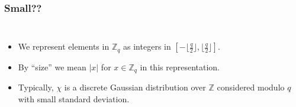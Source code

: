 \documentclass[10pt]{beamer}
\newcommand{\abs}[1]{\ensuremath{|#1|}\xspace}
\newcommand{\Z}{\ensuremath{\mathbb{Z}}\xspace}
\newcommand{\Zq}{\ensuremath{\Z_q}\xspace}
\begin{document}
\begin{frame}
\frametitle{Small??}

\begin{columns}
\begin{itemize}
  \item<1-> We represent elements in $\Zq$ as integers in $[-\lfloor\frac{q}{2}\rfloor, \lfloor\frac{q}{2}\rfloor]$.
  \item<1-> By ``size'' we mean $\abs{x}$ for $x \in \Z_q$ in this representation.
  \item<2-> Typically, $\chi$ is a discrete Gaussian distribution over $\Z$ considered modulo $q$ with small standard deviation.
\end{itemize}

\hspace{-18em}

\end{columns}
\end{frame}
\end{document}

